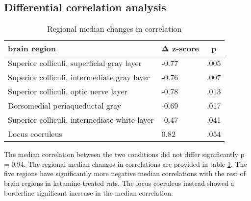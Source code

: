 \documentclass[man]{apa6}
\begin{document}
\hypertarget{differential-correlation-analysis-1}{%
\subsection{Differential correlation analysis}\label{differential-correlation-analysis-1}}

\begin{table}[tbp]
\begin{center}
\begin{threeparttable}
\caption{\label{tab:dca-regional-average}Regional median changes in correlation}
\begin{tabular}{lll}
\toprule
brain region & \multicolumn{1}{c}{Δ z-score} & \multicolumn{1}{c}{p}\\
\midrule
Superior colliculi, superficial gray layer & -0.77 & .005\\
Superior colliculi, intermediate gray layer & -0.76 & .007\\
Superior colliculi, optic nerve layer & -0.78 & .013\\
Dorsomedial periaqueductal gray & -0.69 & .017\\
Superior colliculi, intermediate white layer & -0.47 & .041\\
Locus coeruleus & 0.82 & .054\\
\bottomrule
\end{tabular}
\end{threeparttable}
\end{center}
\end{table}

The median correlation between the two conditions did not differ significantly p = 0.94. The regional median changes in correlations are provided in table \ref{tab:dca-regional-average}. The five regions have significantly more negative median correlations with the rest of brain regions in ketamine-treated rats. The locus coeruleus instead showed a borderline significant increase in the median correlation.

\begingroup\fontsize{12}{14}\selectfont
\end{document}
